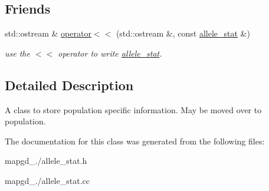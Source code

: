 \subsection*{Friends}
\begin{DoxyCompactItemize}
\item 
\hypertarget{classallele__stat_a3b57c3b3704522365fb3d4901af810e9}{std\-::ostream \& \hyperlink{classallele__stat_a3b57c3b3704522365fb3d4901af810e9}{operator$<$$<$} (std\-::ostream \&, const \hyperlink{classallele__stat}{allele\-\_\-stat} \&)}\label{classallele__stat_a3b57c3b3704522365fb3d4901af810e9}

\begin{DoxyCompactList}\small\item\em use the $<$$<$ operator to write \hyperlink{classallele__stat}{allele\-\_\-stat}. \end{DoxyCompactList}\end{DoxyCompactItemize}


\subsection{Detailed Description}
A class to store population specific information. May be moved over to population. 

The documentation for this class was generated from the following files\-:\begin{DoxyCompactItemize}
\item 
mapgd\-\_./allele\-\_\-stat.\-h\item 
mapgd\-\_./allele\-\_\-stat.\-cc\end{DoxyCompactItemize}
